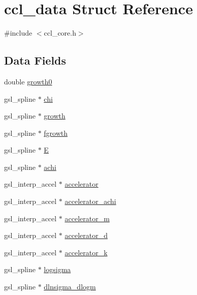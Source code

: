 \hypertarget{structccl__data}{}\section{ccl\+\_\+data Struct Reference}
\label{structccl__data}


{\ttfamily \#include $<$ccl\+\_\+core.\+h$>$}

\subsection*{Data Fields}
\begin{DoxyCompactItemize}
\item 
double \mbox{\hyperlink{structccl__data_a358d6ef796c6498a702840d987c888c8}{growth0}}
\item 
gsl\+\_\+spline $\ast$ \mbox{\hyperlink{structccl__data_a0101139b28262b96a1cd8e0f2bf67509}{chi}}
\item 
gsl\+\_\+spline $\ast$ \mbox{\hyperlink{structccl__data_a38f6caf298ee71f62260082c28323bec}{growth}}
\item 
gsl\+\_\+spline $\ast$ \mbox{\hyperlink{structccl__data_a4669cf3ca24eb93d4007a463f1a68db5}{fgrowth}}
\item 
gsl\+\_\+spline $\ast$ \mbox{\hyperlink{structccl__data_a6e2b679360c102f536705767dcce3f87}{E}}
\item 
gsl\+\_\+spline $\ast$ \mbox{\hyperlink{structccl__data_a0b1087588bd517142a5b6f8c352218e0}{achi}}
\item 
gsl\+\_\+interp\+\_\+accel $\ast$ \mbox{\hyperlink{structccl__data_ad8d2aef21dc9cf1fdee8e4afe3778b33}{accelerator}}
\item 
gsl\+\_\+interp\+\_\+accel $\ast$ \mbox{\hyperlink{structccl__data_a813c89f4e504a5954b47d7b7797c49a3}{accelerator\+\_\+achi}}
\item 
gsl\+\_\+interp\+\_\+accel $\ast$ \mbox{\hyperlink{structccl__data_a80406bf4aa0f060bedc245b2b960c547}{accelerator\+\_\+m}}
\item 
gsl\+\_\+interp\+\_\+accel $\ast$ \mbox{\hyperlink{structccl__data_aef120c743423fc4967e56fe0f60b52c8}{accelerator\+\_\+d}}
\item 
gsl\+\_\+interp\+\_\+accel $\ast$ \mbox{\hyperlink{structccl__data_af4d4a86009087a7fd3013885cc2811b1}{accelerator\+\_\+k}}
\item 
gsl\+\_\+spline $\ast$ \mbox{\hyperlink{structccl__data_a8b877a586de0aa78c7585338730b3139}{logsigma}}
\item 
gsl\+\_\+spline $\ast$ \mbox{\hyperlink{structccl__data_abbc06d5374095c69022c3ec9532ec146}{dlnsigma\+\_\+dlogm}}

\end{DoxyCompactItemize}
